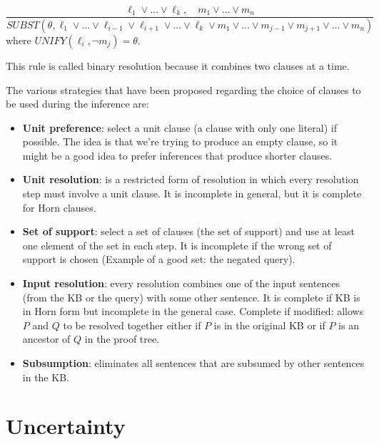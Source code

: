 \documentclass[12pt]{article}
\begin{document}
\begin{enumerate}[label=\textbf{FOL.\arabic*}]
          \begin{equation}
              \frac{\ell_1\lor\ldots\lor \ell_k,\quad m_1\lor\ldots\lor m_n}
              {SUBST(\theta,\ell_1\lor\ldots\lor\ell_{i-1}\lor\ell_{i+1}\lor\ldots\lor\ell_k\lor m_1\lor\ldots\lor m_{j-1}\lor m_{j+1}\lor\ldots\lor m_n)}
          \end{equation}
          where $UNIFY(\ell_i,\lnot m_j) = \theta$.

          This rule is called binary resolution because it combines two clauses at a time.

          The various strategies that have been proposed regarding the choice of clauses to be used during the inference are:

          \begin{itemize}
              \item \textbf{Unit preference}: select a unit clause (a clause with only one literal) if possible. The idea is that we're trying to produce an empty clause, so it might be a good idea to prefer inferences that produce shorter clauses.
              \item \textbf{Unit resolution}: is a restricted form of resolution in which every resolution step must involve a unit clause. It is incomplete in general, but it is complete for Horn clauses.
              \item \textbf{Set of support}: select a set of clauses (the set of support) and use at least one element of the set in each step. It is incomplete if the wrong set of support is chosen (Example of a good set: the negated query).
              \item \textbf{Input resolution}: every resolution combines one of the input sentences (from the KB or the query) with some other sentence. It is complete if KB is in Horn form but incomplete in the general case. Complete if modified: allows $P$ and $Q$ to be resolved together either if $P$ is in the original KB or if $P$ is an ancestor of $Q$ in the proof tree.
              \item \textbf{Subsumption}: eliminates all sentences that are subsumed by other sentences in the KB.
          \end{itemize}

\end{enumerate}

\section{Uncertainty}
\end{document}
